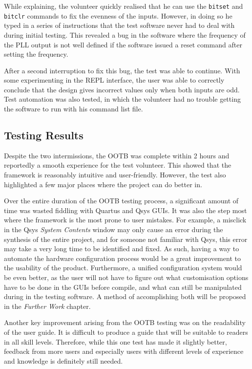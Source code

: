 While explaining, the volunteer quickly realised that he can use the \texttt{bitset} and \texttt{bitclr} commands to fix the evenness of the inputs.
However, in doing so he typed in a series of instructions that the test software never had to deal with during initial testing.
This revealed a bug in the software where the frequency of the PLL output is not well defined if the software issued a reset command after setting the frequency.

After a second interruption to fix this bug, the test was able to continue.
With some experimenting in the REPL interface, the user was able to correctly conclude that the design gives incorrect values only when both inputs are odd.
Test automation was also tested, in which the volunteer had no trouble getting the software to run with his command list file.

\subsection{Testing Results}
Despite the two intermissions, the OOTB was complete within 2 hours and reportedly a smooth experience for the test volunteer.
This showed that the framework is reasonably intuitive and user-friendly.
However, the test also highlighted a few major places where the project can do better in.

Over the entire duration of the OOTB testing process, a significant amount of time was wasted fiddling with Quartus and Qsys GUIs.
It was also the step most where the framework is the most prone to user mistakes.
For example, a misclick in the Qsys \textit{System Contents} window may only cause an error during the synthesis of the entire project, and for someone not familiar with Qsys, this error may take a very long time to be identified and fixed.
As such, having a way to automate the hardware configuration process would be a great improvement to the usability of the product.
Furthermore, a unified configuration system would be even better, as the user will not have to figure out what customisation options have to be done in the GUIs before compile, and what can still be manipulated during in the testing software.
A method of accomplishing both will be proposed in the \textit{Further Work} chapter.

Another key improvement arising from the OOTB testing was on the readability of the user guide.
It is difficult to produce a guide that will be suitable to readers in all skill levels.
Therefore, while this one test has made it slightly better, feedback from more users and especially users with different levels of experience and knowledge is definitely still needed.
